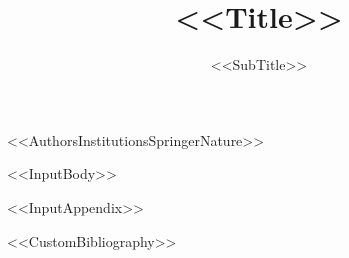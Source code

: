 \documentclass[%
sn-mathphys,
<<DocumentClassOptions>>]{sn-jnl}
\begin{document}
\title[<<ShortTitle>>]{<<Title>>}
\subtitle{<<SubTitle>>}

<<AuthorsInstitutionsSpringerNature>>






\maketitle

<<InputBody>>

\begin{appendices}
<<InputAppendix>>
\end{appendices}

<<CustomBibliography>>
\end{document}
